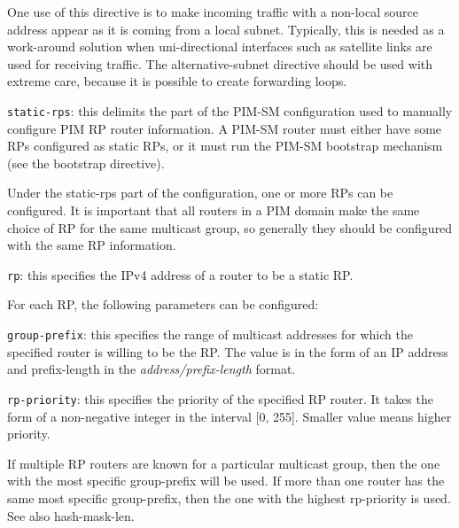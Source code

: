 \begin{description}
\begin{description}
  One use of this directive is to make incoming traffic with a
  non-local source address appear as it is coming from a local
  subnet. Typically, this is needed as a work-around solution when
  uni-directional interfaces such as satellite links are used for
  receiving traffic.  The {\stt alternative-subnet} directive should be
  used with extreme care, because it is possible to create forwarding
  loops.
\end{description}
\item{\tt static-rps}: this delimits the part of the PIM-SM
  configuration used to manually configure PIM RP router information.
  A PIM-SM router must either have some RPs configured as static RPs,
  or it must run the PIM-SM bootstrap mechanism (see the {\stt
  bootstrap} directive).  

  Under the {\stt static-rps} part of the configuration, one or more
  RPs can be configured.  It is important that all routers in a PIM
  domain make the same choice of RP for the same multicast group, so
  generally they should be configured with the same RP information.
\begin{description}
\item{\tt rp}: this specifies the IPv4 address of a router to be a
  static RP.  

  For each RP, the following parameters can be configured:
\begin{description}
\item{\tt group-prefix}: this specifies the range of multicast
  addresses for which the specified router is willing to be the RP.
  The value is in the form of an IP address and prefix-length in the
  {\it address/prefix-length} format.
\begin{description}
\item{\tt rp-priority}: this specifies the priority of the specified
  RP router.  It takes the form of a non-negative integer in the
  interval [0, 255]. Smaller value means higher priority.

  If multiple RP routers are known for a particular multicast group,
  then the one with the most specific {\stt group-prefix} will be
  used.  If more than one router has the same most specific {\stt
  group-prefix}, then the one with the highest {\stt rp-priority} is
  used.  See also {\stt hash-mask-len}.


\end{description}
\end{description}
\end{description}
\end{description}
